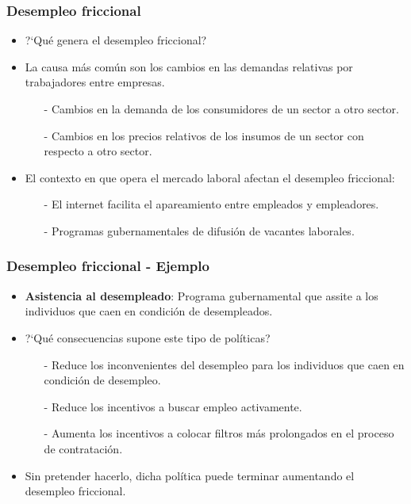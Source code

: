 \documentclass{beamer}
\begin{document}
\begin{frame}
\frametitle{Desempleo friccional}
\begin{itemize}
\setlength\itemsep{1.3em}
\item ?`Qu\'e genera el desempleo friccional?
\item La causa m\'as com\'un son los cambios en las demandas relativas por trabajadores entre empresas.\\
\begin{itemize}
\setlength\itemsep{0.7em}
\item[-] Cambios en la demanda de los consumidores de un sector a otro sector.
\item[-] Cambios en los precios relativos de los insumos de un sector con respecto a otro sector.
\end{itemize}
\item El contexto en que opera el mercado laboral afectan el desempleo friccional:\\
\begin{itemize}
\setlength\itemsep{0.7em}
\item[-] El internet facilita el apareamiento entre empleados y empleadores.
\item[-] Programas gubernamentales de difusi\'on de vacantes laborales.
\end{itemize}
\end{itemize}
\end{frame}

\begin{frame}
\frametitle{Desempleo friccional - Ejemplo}
\begin{itemize}
\setlength\itemsep{1.4em}
\item \textbf{Asistencia al desempleado}: Programa gubernamental que assite a los individuos que caen en condici\'on de desempleados.
\item ?`Qu\'e consecuencias supone este tipo de pol\'iticas?\\
\begin{itemize}
\setlength\itemsep{1.0em}
\item[-] Reduce los inconvenientes del desempleo para los individuos que caen en condici\'on de desempleo.
\item[-] Reduce los incentivos a buscar empleo activamente.
\item[-] Aumenta los incentivos a colocar filtros m\'as prolongados en el proceso de contrataci\'on.
\end{itemize}
\item Sin pretender hacerlo, dicha pol\'itica puede terminar aumentando el desempleo friccional.
\end{itemize}
\end{frame}
\end{document}
